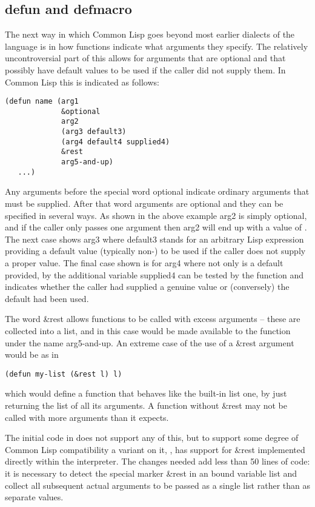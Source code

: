 \subsection{{\tx defun} and {\tx defmacro}}
The next way in which Common Lisp goes beyond most earlier dialects of
the language is in how functions indicate what arguments they specify.
The relatively uncontroversial part of this allows for arguments that are
optional and that possibly have default values to be used if the caller
did not supply them. In Common Lisp this is indicated as follows:
{\small\begin{verbatim}
(defun name (arg1
             &optional
             arg2
             (arg3 default3)
             (arg4 default4 supplied4)
             &rest
             arg5-and-up)
   ...)
\end{verbatim}}
Any arguments before the special word {\tx optional} indicate ordinary
arguments that must be supplied. After that word arguments are optional
and they can be specified in several ways. As shown in the above example
{\tx arg2} is simply optional, and if the caller only passes one argument
then {\tx arg2} will end up with a value of \nil. The next
case shows {\tx arg3} where {\tx default3} stands for an arbitrary Lisp
expression providing a default value (typically non-\nil) to be used if
the caller does not supply a proper value. The final case shown is for
{\tx arg4} where not only is a default provided, by the additional variable
{\tx supplied4} can be tested by the function and indicates whether
the caller had supplied a genuine value or (conversely) the default had
been used.

The word {\tx \&rest} allows functions to be called with excess arguments --
these are collected into a list, and in this case would be made available
to the function under the name {\tx arg5-and-up}. An extreme case of the use
of a {\tx \&rest} argument would be as in
{\small\begin{verbatim}
(defun my-list (&rest l) l)
\end{verbatim}}
\noindent which would define a function that behaves like the built-in
{\tx list} one, by just returning the list of all its arguments. A function
without {\tx \&rest} may not be called with more arguments than it expects.

The initial code in \vsl{} does not support any of this, but to support
some degree of Common Lisp compatibility a variant on it, \vcl{},
has support for {\tx \&rest} implemented directly within the interpreter.
The changes needed add less than 50 lines of code: it is necessary to
detect the special marker {\tx \&rest} in an bound variable list and collect
all subsequent actual arguments to be passed as a single list rather than
as separate values.

